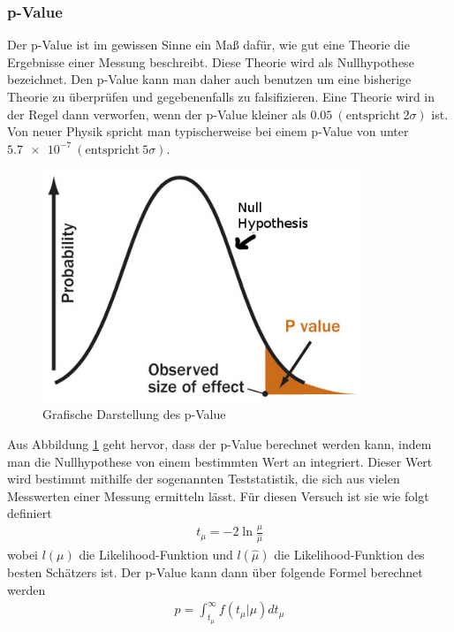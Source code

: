 \subsubsection{p-Value}
Der p-Value ist im gewissen Sinne ein Maß dafür, wie gut eine Theorie die Ergebnisse einer Messung beschreibt.
Diese Theorie wird als Nullhypothese bezeichnet.
Den p-Value kann man daher auch benutzen um eine bisherige Theorie zu überprüfen und gegebenenfalls zu falsifizieren.
Eine Theorie wird in der Regel dann verworfen, wenn der p-Value kleiner als $\num{0.05} \ (\text{entspricht} \ 2 \sigma)$ ist.
Von neuer Physik spricht man typischerweise bei einem p-Value von unter $\num{5.7e-7} \ (\text{entspricht}\  5 \sigma)$.
\begin{figure}
	\centering
  \includegraphics[width=0.85\textwidth]{../Pictures/p_value.png}
  \caption{Grafische Darstellung des p-Value \cite{p_val}}
  \label{fig_p_value}
\end{figure}
Aus Abbildung \ref{fig_p_value} geht hervor, dass der p-Value berechnet werden kann, indem man die Nullhypothese von einem bestimmten Wert an integriert.
Dieser Wert wird bestimmt mithilfe der sogenannten Teststatistik, die sich aus vielen Messwerten einer Messung ermitteln lässt.
Für diesen Versuch ist sie wie folgt definiert
\begin{gather}
	t_{\mu} = -2 \ln{\frac{\mu}{\hat{\mu}}}
\end{gather}
wobei $l(\mu)$ die Likelihood-Funktion und $l(\hat{\mu})$ die Likelihood-Funktion des besten Schätzers ist.
Der p-Value kann dann über folgende Formel berechnet werden
\begin{gather}
	p = \int_{t_{\mu}}^{\infty} f(t_{\mu}|\mu)dt_{\mu}
\end{gather}

